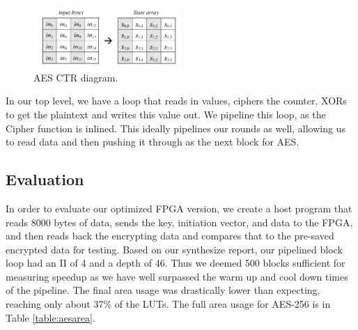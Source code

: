 \begin{figure}[h]
\centering
\includegraphics[width=0.5\textwidth]{aesstate}
\caption{AES CTR diagram.}
\label{fig:aesstate}
\end{figure}

In our top level, we have a loop that reads in values, ciphers the counter, XORs to get the plaintext and writes this value out. We pipeline this loop, as the Cipher function is inlined. This ideally pipelines our rounds as well, allowing us to read data and then pushing it through as the next block for AES.  

\subsection{Evaluation}
In order to evaluate our optimized FPGA version, we create a host program that reads 8000 bytes of data, sends the key, initiation vector, and data to the FPGA, and then reads back the encrypting data and compares that to the pre-saved encrypted data for testing. Based on our synthesize report, our pipelined block loop had an II of 4 and a depth of 46. Thus we deemed 500 blocks sufficient for measuring speedup as we have well surpassed the warm up and cool down times of the pipeline. The final area usage was drastically lower than expecting, reaching only about 37\% of the LUTs. The full area usage for AES-256 is in Table \ref{table:aesarea}. 

